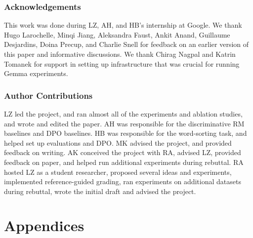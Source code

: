 \documentclass[11pt, letterpaper, logo, copyright]{googledeepmind}
\begin{document}
\section*{Acknowledgements}

This work was done during LZ, AH, and HB's internship at Google. We thank Hugo Larochelle, Minqi Jiang, Aleksandra Faust, Ankit Anand,  Guillaume Desjardins, Doina Precup, 
and Charlie Snell for feedback on an earlier version of this paper and informative discussions. We thank Chirag Nagpal and Katrin Tomanek for support in setting up infrastructure that was crucial for running Gemma experiments.

\section*{Author Contributions}

LZ led the project, and ran almost all of the experiments and ablation studies, and wrote and edited the paper. AH was responsible for the discriminative RM baselines and DPO baselines. HB was responsible for the word-sorting task, and helped set up evaluations and DPO. MK advised the project, and provided feedback on writing. AK conceived the project with RA, advised LZ, provided feedback on paper, and helped run additional experiments during rebuttal. RA hosted LZ as a student researcher, proposed several ideas and experiments, implemented reference-guided grading, ran experiments on additional datasets during rebuttal, wrote the initial draft and advised the project.



\newpage
\appendix

\part*{Appendices}



\end{document}
